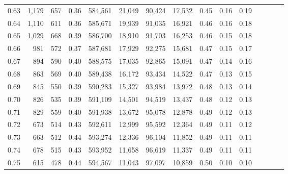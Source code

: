 \begin{tabular}{rrrcrrrrrrrrrrr}
0.63 &   1,179 &    657 &                                       0.36 &  584,561 &   21,049 &   90,424 &   17,532 &  0.45 &  0.16 &                         0.19 \\
0.64 &   1,110 &    611 &                                       0.36 &  585,671 &   19,939 &   91,035 &   16,921 &  0.46 &  0.16 &                         0.18 \\
0.65 &   1,029 &    668 &                                       0.39 &  586,700 &   18,910 &   91,703 &   16,253 &  0.46 &  0.15 &                         0.18 \\
0.66 &     981 &    572 &                                       0.37 &  587,681 &   17,929 &   92,275 &   15,681 &  0.47 &  0.15 &                         0.17 \\
0.67 &     894 &    590 &                                       0.40 &  588,575 &   17,035 &   92,865 &   15,091 &  0.47 &  0.14 &                         0.16 \\
0.68 &     863 &    569 &                                       0.40 &  589,438 &   16,172 &   93,434 &   14,522 &  0.47 &  0.13 &                         0.15 \\
0.69 &     845 &    550 &                                       0.39 &  590,283 &   15,327 &   93,984 &   13,972 &  0.48 &  0.13 &                         0.14 \\
0.70 &     826 &    535 &                                       0.39 &  591,109 &   14,501 &   94,519 &   13,437 &  0.48 &  0.12 &                         0.13 \\
0.71 &     829 &    559 &                                       0.40 &  591,938 &   13,672 &   95,078 &   12,878 &  0.49 &  0.12 &                         0.13 \\
0.72 &     673 &    514 &                                       0.43 &  592,611 &   12,999 &   95,592 &   12,364 &  0.49 &  0.11 &                         0.12 \\
0.73 &     663 &    512 &                                       0.44 &  593,274 &   12,336 &   96,104 &   11,852 &  0.49 &  0.11 &                         0.11 \\
0.74 &     678 &    515 &                                       0.43 &  593,952 &   11,658 &   96,619 &   11,337 &  0.49 &  0.11 &                         0.11 \\
0.75 &     615 &    478 &                                       0.44 &  594,567 &   11,043 &   97,097 &   10,859 &  0.50 &  0.10 &                         0.10 \\

\end{tabular}
